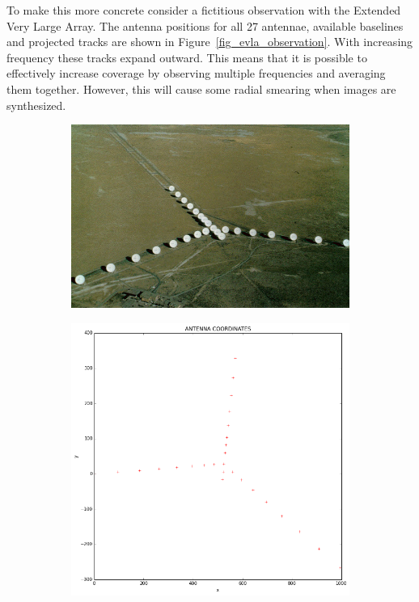 To make this more concrete consider a fictitious observation with the Extended Very Large Array. The antenna 
positions for all 27 antennae, available baselines and projected tracks are shown in Figure~\ref{fig_evla_observation}. With
increasing frequency these tracks expand outward. This means that it is possible to effectively increase coverage
by observing multiple frequencies and averaging them together. However, this will cause some radial smearing when
images are synthesized.

\begin{figure}[h]
 \begin{mdframed}
 \centering
 \begin{subfigure}[b]{0.32\textwidth}
  \includegraphics[width=\textwidth]{images/vla.jpg}
  \caption{}
 \end{subfigure}
 \begin{subfigure}[b]{0.32\textwidth}
  \includegraphics[width=\textwidth]{images/evla_observation/array_config.png}

\end{subfigure}
\end{mdframed}
\end{figure}
